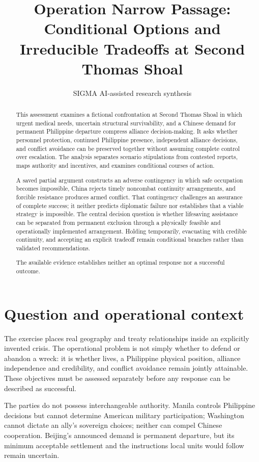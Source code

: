 \documentclass[11pt]{article}
\title{Operation Narrow Passage: Conditional Options and Irreducible Tradeoffs at Second Thomas Shoal}
\date{}
\author{SIGMA AI-assisted research synthesis}
\begin{document}
\maketitle

\begin{abstract}
This assessment examines a fictional confrontation at Second Thomas Shoal in which urgent medical needs, uncertain structural survivability, and a Chinese demand for permanent Philippine departure compress alliance decision-making. It asks whether personnel protection, continued Philippine presence, independent alliance decisions, and conflict avoidance can be preserved together without assuming complete control over escalation. The analysis separates scenario stipulations from contested reports, maps authority and incentives, and examines conditional courses of action.

A saved partial argument constructs an adverse contingency in which safe occupation becomes impossible, China rejects timely noncombat continuity arrangements, and forcible resistance produces armed conflict. That contingency challenges an assurance of complete success; it neither predicts diplomatic failure nor establishes that a viable strategy is impossible. The central decision question is whether lifesaving assistance can be separated from permanent exclusion through a physically feasible and operationally implemented arrangement. Holding temporarily, evacuating with credible continuity, and accepting an explicit tradeoff remain conditional branches rather than validated recommendations.

The available evidence establishes neither an optimal response nor a successful outcome.
\end{abstract}
\section{Question and operational context}
The exercise places real geography and treaty relationships inside an explicitly invented crisis. The operational problem is not simply whether to defend or abandon a wreck: it is whether lives, a Philippine physical position, alliance independence and credibility, and conflict avoidance remain jointly attainable. These objectives must be assessed separately before any response can be described as successful.

The parties do not possess interchangeable authority. Manila controls Philippine decisions but cannot determine American military participation; Washington cannot dictate an ally's sovereign choices; neither can compel Chinese cooperation. Beijing's announced demand is permanent departure, but its minimum acceptable settlement and the instructions local units would follow remain uncertain.
\end{document}
